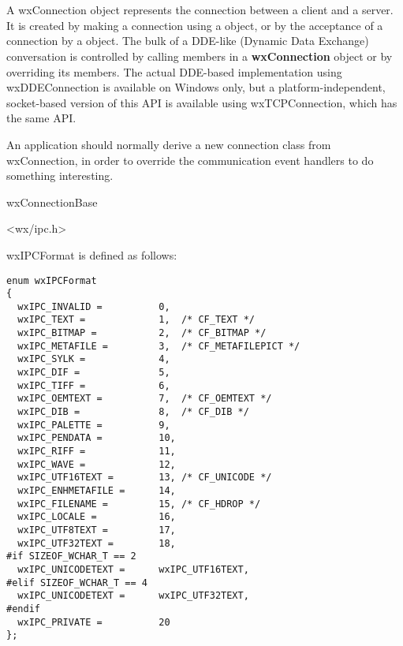 \section{}\label{wxconnection}

A wxConnection object represents the connection between a client
and a server. It is created by making a connection using a\rtfsp
{} object, or by the acceptance of a
connection by a\rtfsp {} object. The
bulk of a DDE-like (Dynamic Data Exchange) conversation is
controlled by calling members in a {\bf wxConnection} object or
by overriding its members. The actual DDE-based implementation
using wxDDEConnection is available on Windows only, but a
platform-independent, socket-based version of this API is
available using wxTCPConnection, which has the same API.

An application should normally derive a new connection class from
wxConnection, in order to override the communication event
handlers to do something interesting.


wxConnectionBase\\


<wx/ipc.h>


wxIPCFormat is defined as follows:

\begin{verbatim}
enum wxIPCFormat
{
  wxIPC_INVALID =          0,
  wxIPC_TEXT =             1,  /* CF_TEXT */
  wxIPC_BITMAP =           2,  /* CF_BITMAP */
  wxIPC_METAFILE =         3,  /* CF_METAFILEPICT */
  wxIPC_SYLK =             4,
  wxIPC_DIF =              5,
  wxIPC_TIFF =             6,
  wxIPC_OEMTEXT =          7,  /* CF_OEMTEXT */
  wxIPC_DIB =              8,  /* CF_DIB */
  wxIPC_PALETTE =          9,
  wxIPC_PENDATA =          10,
  wxIPC_RIFF =             11,
  wxIPC_WAVE =             12,
  wxIPC_UTF16TEXT =        13, /* CF_UNICODE */
  wxIPC_ENHMETAFILE =      14,
  wxIPC_FILENAME =         15, /* CF_HDROP */
  wxIPC_LOCALE =           16,
  wxIPC_UTF8TEXT =         17,
  wxIPC_UTF32TEXT =        18,
#if SIZEOF_WCHAR_T == 2
  wxIPC_UNICODETEXT =      wxIPC_UTF16TEXT,
#elif SIZEOF_WCHAR_T == 4
  wxIPC_UNICODETEXT =      wxIPC_UTF32TEXT,
#endif
  wxIPC_PRIVATE =          20
};
\end{verbatim}

